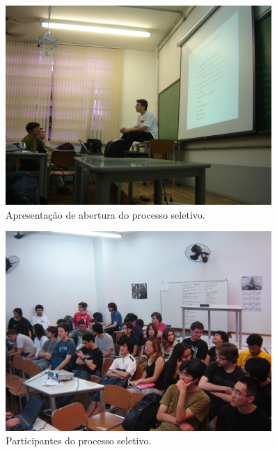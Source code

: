 \documentclass[12pt,onecolumn,a4paper]{article}
\begin{document}
        \begin{figure}[htb]
            \centering
            \includegraphics[width=0.9\textwidth]{images/seletivo_01.jpg}
            \caption{Apresentação de abertura do processo seletivo.}
            \label{fig:seletivo_01}
        \end{figure}
        
        \begin{figure}[htb]
            \centering
            \includegraphics[width=0.9\textwidth]{images/seletivo_02.jpg}
            \caption{Participantes do processo seletivo.}
            \label{fig:seletivo_02}
        \end{figure}
        
        
\end{document}
